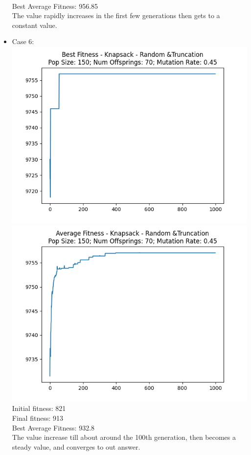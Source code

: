 \documentclass[12pt]{report} %
\begin{document}
\begin{itemize}
	      \\Best Average Fitness: 956.85
	      \\The value rapidly increases in the first few generations then gets to a constant value.
	\item Case 6:\\
	      \includegraphics[scale=0.5]{../Analysis/BSF_Knapsack_4_3_150_70.png}
	      \includegraphics[scale=0.5]{../Analysis/ASF_Knapsack_4_3_150_70.png}
	      \\Initial fitness:  821
	      \\Final fitness:  913
	      \\Best Average Fitness: 932.8
	      \\ The value increase till about around the 100th generation, then becomes a steady value, and converges to out answer.

\end{itemize}
\end{document}
